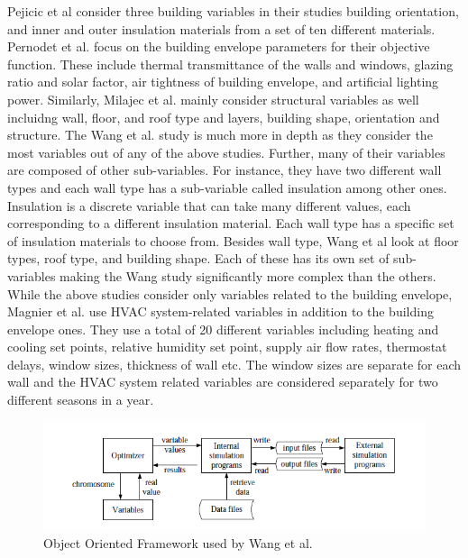 Pejicic et al consider three building variables in their studies \textemdash building orientation, and inner and outer insulation materials from a set of ten different materials. Pernodet et al. \cite{Pernodet2009} focus on the building envelope parameters for their objective function. These include thermal transmittance of the walls and windows, glazing ratio and solar factor, air tightness of building envelope, and artificial lighting power. Similarly, Milajec et al. mainly consider structural variables as well incluidng wall, floor, and roof type and layers, building shape, orientation and structure. The Wang et al. study is much more in depth as they consider the most variables out of any of the above studies. Further, many of their variables are composed of other sub-variables. For instance, they have two different wall types and each wall type has a sub-variable called insulation among other ones. Insulation is a discrete variable that can take many different values, each corresponding to a different insulation material. Each wall type has a specific set of insulation materials to choose from. Besides wall type, Wang et al look at floor types, roof type, and building shape. Each of these has its own set of sub-variables making the Wang study significantly more complex than the others. While the above studies consider only variables related to the building envelope, Magnier et al. use HVAC system-related variables in addition to the building envelope ones. They use a total of 20 different variables including heating and cooling set points, relative humidity set point, supply air flow rates, thermostat delays, window sizes, thickness of wall etc. The window sizes are separate for each wall and the HVAC system related variables are considered separately for two different seasons in a year. 


\begin{figure}[htbp]
\centering
\includegraphics[width=\linewidth]{images/ooframework.png}
\caption{Object Oriented Framework used by Wang et al. \cite{Wang2005b}}
\label{fig:wang}
\end{figure}

